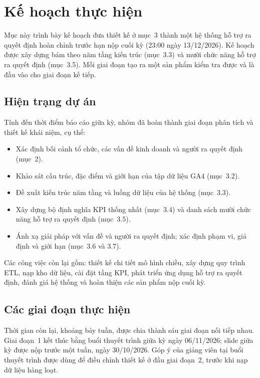 
\section{Kế hoạch thực hiện}
\label{sec:ke-hoach}

Mục này trình bày kế hoạch đưa thiết kế ở mục~3 thành một hệ thống hỗ trợ ra quyết
định hoàn chỉnh trước hạn nộp cuối kỳ (23:00 ngày 13/12/2026). Kế hoạch được xây dựng
bám theo năm tầng kiến trúc (mục~3.3) và mười chức năng hỗ trợ ra quyết định
(mục~3.5). Mỗi giai đoạn tạo ra một sản phẩm kiểm tra được và là đầu vào cho giai
đoạn kế tiếp.

\subsection{Hiện trạng dự án}
\label{subsec:hien-trang}

Tính đến thời điểm báo cáo giữa kỳ, nhóm đã hoàn thành giai đoạn phân tích và thiết
kế khái niệm, cụ thể:
\begin{itemize}
    \item Xác định bối cảnh tổ chức, các vấn đề kinh doanh và người ra quyết định
          (mục~2).
    \item Khảo sát cấu trúc, đặc điểm và giới hạn của tập dữ liệu GA4 (mục~3.2).
    \item Đề xuất kiến trúc năm tầng và luồng dữ liệu của hệ thống (mục~3.3).
    \item Xây dựng bộ định nghĩa KPI thống nhất (mục~3.4) và danh sách mười chức năng
          hỗ trợ ra quyết định (mục~3.5).
    \item Ánh xạ giải pháp với vấn đề và người ra quyết định; xác định phạm vi, giả
          định và giới hạn (mục~3.6 và 3.7).
\end{itemize}

Các công việc còn lại gồm: thiết kế chi tiết mô hình chiều, xây dựng quy trình ETL,
nạp kho dữ liệu, cài đặt tầng KPI, phát triển ứng dụng hỗ trợ ra quyết định, đánh giá
hệ thống và hoàn thiện các sản phẩm nộp cuối kỳ.

\subsection{Các giai đoạn thực hiện}
\label{subsec:giai-doan}

Thời gian còn lại, khoảng bảy tuần, được chia thành sáu giai đoạn nối tiếp nhau.
Giai đoạn~1 kết thúc bằng buổi thuyết trình giữa kỳ ngày 06/11/2026; slide giữa kỳ được
nộp trước một tuần, ngày 30/10/2026. Góp ý của giảng viên tại buổi thuyết trình được
dùng để điều chỉnh thiết kế ở đầu giai đoạn~2, trước khi nạp dữ liệu hàng loạt.

